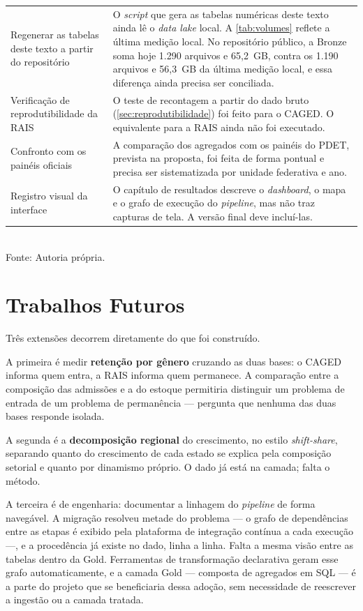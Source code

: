 \begin{quadro}[htbp]
\begin{tabularx}{\textwidth}{%
        >{\raggedright\arraybackslash\hsize=0.62\hsize}X
        >{\raggedright\arraybackslash\hsize=1.38\hsize}X}
        Regenerar as tabelas deste texto a partir do repositório &
        O \textit{script} que gera as tabelas numéricas deste texto ainda lê o \textit{data lake} local. A \autoref{tab:volumes} reflete a última medição local. No repositório público, a Bronze soma hoje 1.290 arquivos e 65,2~GB, contra os 1.190 arquivos e 56,3~GB da última medição local, e essa diferença ainda precisa ser conciliada. \\
        Verificação de reprodutibilidade da RAIS &
        O teste de recontagem a partir do dado bruto (\autoref{sec:reprodutibilidade}) foi feito para o CAGED. O equivalente para a RAIS ainda não foi executado. \\
        Confronto com os painéis oficiais &
        A comparação dos agregados com os painéis do PDET, prevista na proposta, foi feita de forma pontual e precisa ser sistematizada por unidade federativa e ano. \\
        Registro visual da interface &
        O capítulo de resultados descreve o \textit{dashboard}, o mapa e o grafo de execução do \textit{pipeline}, mas não traz capturas de tela. A versão final deve incluí-las. \\
        \bottomrule
    \end{tabularx}
    \\[4pt]
    Fonte: Autoria própria.
\end{quadro}

\section{Trabalhos Futuros}

Três extensões decorrem diretamente do que foi construído.

A primeira é medir \textbf{retenção por gênero} cruzando as duas bases: o CAGED informa quem entra, a RAIS informa quem permanece. A comparação entre a composição das admissões e a do estoque permitiria distinguir um problema de entrada de um problema de permanência --- pergunta que nenhuma das duas bases responde isolada.

A segunda é a \textbf{decomposição regional} do crescimento, no estilo \textit{shift-share}, separando quanto do crescimento de cada estado se explica pela composição setorial e quanto por dinamismo próprio. O dado já está na camada; falta o método.

A terceira é de engenharia: documentar a linhagem do \textit{pipeline} de forma navegável. A migração resolveu metade do problema --- o grafo de dependências entre as etapas é exibido pela plataforma de integração contínua a cada execução ---, e a procedência já existe no dado, linha a linha. Falta a mesma visão entre as tabelas dentro da Gold. Ferramentas de transformação declarativa geram esse grafo automaticamente, e a camada Gold --- composta de agregados em SQL --- é a parte do projeto que se beneficiaria dessa adoção, sem necessidade de reescrever a ingestão ou a camada tratada.

